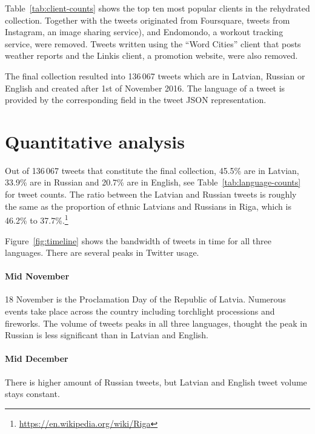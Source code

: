 \documentclass[11pt,a4paper]{article}
\begin{document}


Table~\ref{tab:client-counts} shows the top ten most popular clients in the rehydrated collection. Together with the tweets originated from Foursquare, tweets from Instagram, an image sharing service), and Endomondo, a workout tracking service, were removed. Tweets written using the ``Word Cities'' client that posts weather reports and the Linkis client, a promotion website, were also removed.

The final collection resulted into 136\,067 tweets which are in Latvian, Russian or English and created after 1st of November 2016. The language of a tweet is provided by the corresponding field in the tweet JSON representation.




\section{Quantitative analysis}
\label{sec:quantitative}

Out of 136\,067 tweets that constitute the final collection, 45.5\% are in Latvian, 33.9\% are in Russian and 20.7\% are in English, see Table~\ref{tab:language-counts} for tweet counts. The ratio between the Latvian and Russian tweets is roughly the same as the proportion of ethnic Latvians and Russians in Riga, which is 46.2\% to 37.7\%.\footnote{\url{https://en.wikipedia.org/wiki/Riga}}



Figure~\ref{fig:timeline} shows the bandwidth of tweets in time for all three languages. There are several peaks in Twitter usage.

\paragraph{Mid November}

18 November is the Proclamation Day of the Republic of Latvia. Numerous events take place across the country including torchlight processions and fireworks. The volume of tweets peaks in all three languages, thought the peak in Russian is less significant than in Latvian and English.

\paragraph{Mid December}

There is higher amount of Russian tweets, but Latvian and English tweet volume stays constant.
\end{document}
